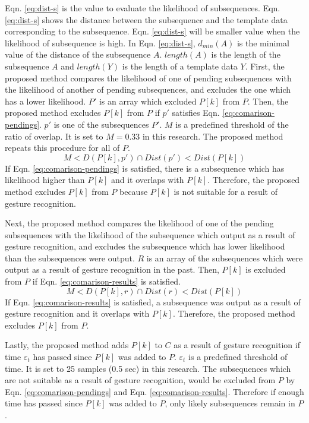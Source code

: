 \documentclass{sigchi-ext}
\begin{document}
        Eqn. \ref{eq:dist-s} is the value to evaluate the likelihood of subsequences. Eqn. \ref{eq:dist-s} shows the distance between the subsequence and the template data corresponding to the subsequence. Eqn. \ref{eq:dist-s} will be smaller value when the likelihood of subsequence is high. In Eqn. \ref{eq:dist-s}, $ d_{min}(A) $ is the minimal value of the distance of the subsequence $A$. $length(A)$ is the length of the subsequence $A$ and $length(Y)$ is the length of a template data $Y$.
        First, the proposed method compares the likelihood of one of pending subsequences with the likelihood of another of pending subsequences, and excludes the one which has a lower likelihood. $P'$ is an array which excluded $P[k]$ from $P$. Then, the proposed method excludes $P[k]$ from $P$ if $p'$ satisfies Eqn. \ref{eq:comarison-pendings}. $p'$ is one of the subsequences $P'$. $M$ is a predefined threshold of the ratio of overlap. It is set to $M=0.33$ in this research. The proposed method repeats this procedure for all of $P$.
        \begin{equation}
            M < D(P[k], p') \cap Dist(p') < Dist(P[k])
            \label{eq:comarison-pendings}
        \end{equation}
        If Eqn. \ref{eq:comarison-pendings} is satisfied, there is a subsequence which has likelihood higher than $P[k]$ and it overlaps with $P[k]$. Therefore, the proposed method excludes $P[k]$ from $P$ because $P[k]$ is not suitable for a result of gesture recognition.

        Next, the proposed method compares the likelihood of one of the pending subsequences with the likelihood of the subsequence which output as a result of gesture recognition, and excludes the subsequence which has lower likelihood than the subsequences were output. $R$ is an array of the subsequences which were output as a result of gesture recognition in the past. Then, $P[k]$ is excluded from $P$ if Eqn. \ref{eq:comarison-results} is satisfied.
        \begin{equation}
            M < D(P[k], r) \cap Dist(r) < Dist(P[k])
            \label{eq:comarison-results}
        \end{equation}
        If Eqn. \ref{eq:comarison-results} is satisfied, a subsequence was output as a result of gesture recognition and it overlaps with $P[k]$. Therefore, the proposed method excludes $P[k]$ from $P$.
        
        Lastly, the proposed method adds $P[k]$ to $C$ as a result of gesture recognition if time $ \varepsilon_t $ has passed since $P[k]$ was added to $P$.
        $ \varepsilon_t $ is a predefined threshold of time. It is set to 25 samples (0.5 sec) in this research. The subsequences which are not suitable as a result of gesture recognition, would be excluded from $P$ by Eqn. \ref{eq:comarison-pendings} and Eqn. \ref{eq:comarison-results}. Therefore if enough time has passed since $P[k]$ was added to $P$, only likely subsequences remain in $P$.
        
\end{document}
